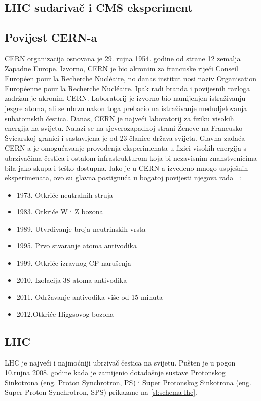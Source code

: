 \documentclass[12pt,a4paper,oneside]{article}
\begin{document}
\begin{linenumbers}
		
		
		\section{LHC sudarivač i CMS eksperiment}
		\subsection{Povijest CERN-a}
		CERN organizacija  osnovana je 29. rujna 1954. godine od strane 12 zemalja Zapadne Europe. Izvorno, CERN je bio akronim za francuske riječi Conseil Européen pour la Recherche Nucléaire, no danas institut nosi naziv Organisation Européenne pour la Recherche Nucléaire. Ipak radi branda i povijesnih razloga zadržan je akronim CERN. Laboratorij je izvorno bio namijenjen istraživanju jezgre atoma, ali se ubrzo nakon toga prebacio na istraživanje međudjelovanja subatomskih čestica. Danas, CERN je najveći laboratorij za fiziku visokih energija na svijetu. Nalazi se na sjeverozapadnoj strani Ženeve na Francusko-Švicarskoj granici i sastavljena je od 23 članice država svijeta. 
		Glavna zadaća CERN-a je omogućavanje provođenja eksperimenata u fizici visokih energija s ubrzivačima čestica i ostalom infrastrukturom koja bi nezavisnim znanstvenicima bila jako skupa i teško dostupna.  Iako je u CERN-a izvedeno  mnogo uspješnih eksperimenata, ovo su glavna postignuća u bogatoj povijesti njegova rada ~\cite{cern-wiki}:
		\begin{itemize}
		\item 1973. Otkriće neutralnih struja
		\item 1983. Otkriće W i Z bozona
		\item 1989. Utvrđivanje broja neutrinskih vrsta
		\item 1995. Prvo stvaranje atoma antivodika
		\item 1999. Otkriće izravnog CP-narušenja
		\item 2010. Izolacija 38 atoma antivodika
		\item 2011. Održavanje antivodika više od 15 minuta
		\item 2012.Otkriće Higgsovog bozona 
		\end{itemize}
		
		\subsection{LHC}
		LHC je najveći i najmoćniji ubrzivač čestica na svijetu. Pušten je u pogon 10.rujna 2008. godine kada je zamijenio dotadašnje sustave Protonskog Sinkotrona (eng. Proton Synchrotron, PS) i Super Protonskog Sinkotrona (eng. Super Proton Synchrotron, SPS) prikazane na \ref{sl:schema-lhc}.
		

\end{linenumbers}
\end{document}

